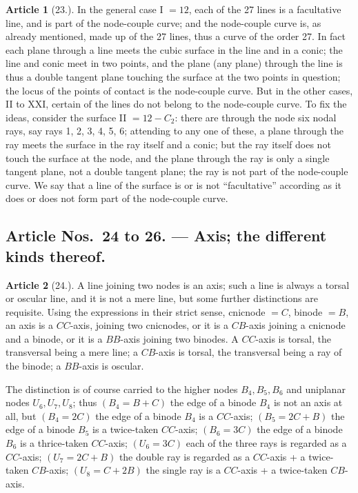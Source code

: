 \documentclass[11pt,a4paper]{article}
\theoremstyle{definition}
\newtheorem{art}{Article}
\begin{document}
\begin{art}[23.]
In the general case I $= 12$, each of the 27 lines is a facultative line, and is part of the node-couple curve; and the node-couple curve is, as already mentioned, made up of the 27 lines, thus a curve of the order 27. In fact each plane through a line meets the cubic surface in the line and in a conic; the line and conic meet in two points, and the plane (any plane) through the line is thus a double tangent plane touching the surface at the two points in question; the locus of the points of contact is the node-couple curve. But in the other cases, II to XXI, certain of the lines do not belong to the node-couple curve. To fix the ideas, consider the surface II $= 12 - C_2$: there are through the node six nodal rays, say rays 1, 2, 3, 4, 5, 6; attending to any one of these, a plane through the ray meets the surface in the ray itself and a conic; but the ray itself does not touch the surface at the node, and the plane through the ray is only a single tangent plane, not a double tangent plane; the ray is not part of the node-couple curve. We say that a line of the surface is or is not ``facultative'' according as it does or does not form part of the node-couple curve.
\end{art}

\newpage
\setcounter{page}{367}

\subsection*{Article Nos.~24 to 26. --- Axis; the different kinds thereof.}

\begin{art}[24.]
A line joining two nodes is an axis; such a line is always a torsal or oscular line, and it is not a mere line, but some further distinctions are requisite. Using the expressions in their strict sense, cnicnode $= C$, binode $= B$, an axis is a $CC$-axis, joining two cnicnodes, or it is a $CB$-axis joining a cnicnode and a binode, or it is a $BB$-axis joining two binodes. A $CC$-axis is torsal, the transversal being a mere line; a $CB$-axis is torsal, the transversal being a ray of the binode; a $BB$-axis is oscular.

The distinction is of course carried to the higher nodes $B_4, B_5, B_6$ and uniplanar nodes $U_6, U_7, U_8$; thus $(B_4 = B + C)$ the edge of a binode $B_4$ is not an axis at all, but $(B_4 = 2C)$ the edge of a binode $B_4$ is a $CC$-axis; $(B_5 = 2C + B)$ the edge of a binode $B_5$ is a twice-taken $CC$-axis; $(B_6 = 3C)$ the edge of a binode $B_6$ is a thrice-taken $CC$-axis; $(U_6 = 3C)$ each of the three rays is regarded as a $CC$-axis; $(U_7 = 2C + B)$ the double ray is regarded as a $CC$-axis + a twice-taken $CB$-axis; $(U_8 = C + 2B)$ the single ray is a $CC$-axis + a twice-taken $CB$-axis.
\end{art}
\end{document}
